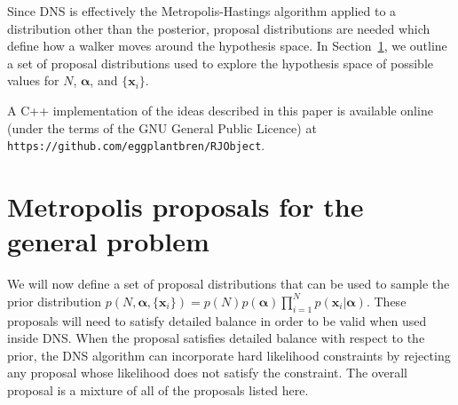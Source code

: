 \documentclass[letterpaper, 11pt]{article}
\newcommand{\hyperparams}{\boldsymbol{\alpha}}
\newcommand{\xx}{\mathbf{x}}
\begin{document}
Since DNS is effectively the Metropolis-Hastings algorithm applied to a
distribution other than the posterior, proposal distributions are needed
which define how a walker moves around the hypothesis space.
In Section~\ref{sec:proposals}, we outline a set of proposal distributions used
to explore the hypothesis space of possible values for $N$, $\hyperparams$,
and $\{\xx_i\}$.

A C++ implementation of the ideas described in this paper is available online
(under the terms of the GNU General Public Licence) at
{\tt https://github.com/eggplantbren/RJObject}.



\section{Metropolis proposals for the general problem}\label{sec:proposals}
We will now define a set of proposal distributions that can be used to
sample the prior distribution
$p(N, \hyperparams, \{\xx_i\}) = p(N) p(\hyperparams) \prod_{i=1}^N p(\xx_i | \hyperparams)$.
These proposals will need to satisfy detailed balance in order to be valid
when used inside DNS. When the proposal satisfies detailed balance with respect
to the prior, the DNS algorithm can incorporate hard likelihood constraints by
rejecting any proposal whose likelihood does not satisfy the constraint.
The overall proposal is a mixture of all of the proposals listed here.
\end{document}
